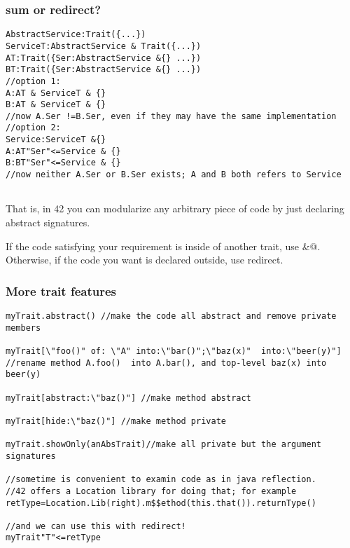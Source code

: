 \begin{frame}[fragile]
\frametitle{ sum or redirect?}
\begin{NiceCode}{59ex}{0.7}
\begin{lstlisting}
AbstractService:Trait({...})
ServiceT:AbstractService & Trait({...})
AT:Trait({Ser:AbstractService &{} ...})
BT:Trait({Ser:AbstractService &{} ...})
//option 1:
A:AT & ServiceT & {}
B:AT & ServiceT & {}
//now A.Ser !=B.Ser, even if they may have the same implementation
//option 2:
Service:ServiceT &{}
A:AT"Ser"<=Service & {}
B:BT"Ser"<=Service & {}
//now neither A.Ser or B.Ser exists; A and B both refers to Service 


\end{lstlisting}
\end{NiceCode}
That is, in 42 you can modularize any arbitrary piece of code by
just declaring abstract signatures.


If the code satisfying your requirement is inside of another trait, use \Q@&@.
Otherwise, if the code you want is declared outside, use redirect. 


\end{frame}

\begin{frame}[fragile]
\frametitle{More trait features}
\begin{NiceCode}{59ex}{0.7}
\begin{lstlisting}
myTrait.abstract() //make the code all abstract and remove private members

myTrait[\"foo()" of: \"A" into:\"bar()";\"baz(x)"  into:\"beer(y)"]
//rename method A.foo()  into A.bar(), and top-level baz(x) into beer(y)

myTrait[abstract:\"baz()"] //make method abstract

myTrait[hide:\"baz()"] //make method private

myTrait.showOnly(anAbsTrait)//make all private but the argument signatures

//sometime is convenient to examin code as in java reflection.
//42 offers a Location library for doing that; for example
retType=Location.Lib(right).m$$ethod(this.that()).returnType()

//and we can use this with redirect!
myTrait"T"<=retType

\end{lstlisting}
\end{NiceCode}
\end{frame}


